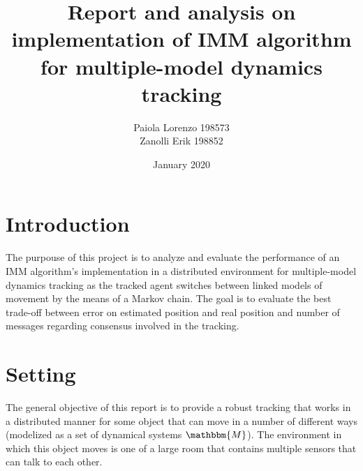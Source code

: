 \documentclass[twocolumn]{article}
\title{Report and analysis on implementation of IMM algorithm for multiple-model dynamics tracking}
\author{
Paiola Lorenzo 198573 

Zanolli Erik 198852}
\date{January 2020}
\begin{document}
\maketitle



\section*{Introduction}
\justify
The purpouse of this project is to analyze and evaluate the performance of an IMM algorithm's implementation in a distributed environment for
multiple-model dynamics tracking as the tracked agent switches between linked models of movement by the means of a Markov chain. The goal 
is to evaluate the best trade-off between error on estimated position and real position and number of messages regarding consensus involved in the tracking.


    \section*{Setting}
    \justify
    The general objective of this report is to provide a robust tracking that works in a distributed manner for some object that can move 
    in a number of different ways (modelized as a set of dynamical systems $\mathbbm{M}$). The environment in which this object moves is 
    one of a large room that contains multiple sensors that can talk to each other.
    \\
\end{document}
